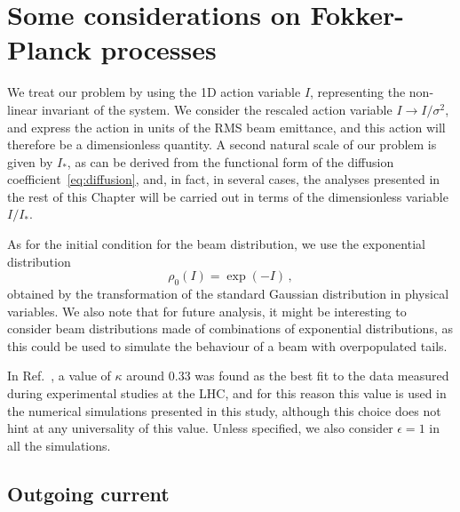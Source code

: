 \section{Some considerations on Fokker-Planck processes}\label{sec:some_considerations}

We treat our problem by using the 1D action variable $I$, representing the non-linear invariant of the system. We consider the rescaled action variable $I \to I/\sigma^2$, and express the action in units of {the RMS} beam emittance, and this action will therefore be a dimensionless quantity. {A second natural scale of our problem is given by $I_\ast$, as can be derived from the functional form of the diffusion coefficient~\eqref{eq:diffusion}, and, in fact, in several cases, the analyses presented in the rest of this Chapter will be carried out in terms of the dimensionless variable $I/I_\ast$.}

As for the initial condition for the beam distribution, we use the exponential distribution
\begin{equation}
    \rho_0(I) = \exp(-I) \, , 
    \label{eq:initial_distribution}
\end{equation}
obtained by the transformation of the standard Gaussian distribution in physical variables. We also note that for future analysis, it might be interesting to consider beam distributions made of combinations of exponential distributions, as this could be used to simulate the behaviour of a beam with overpopulated tails.

In Ref.~\cite{bazzani2020diffusion}, a value of $\kappa$ around $0.33$ was found as the best fit to the data measured during experimental studies at the LHC, and for this reason this value is used in the numerical simulations presented in this study, {although this choice does not hint at any universality of this value.} Unless specified, we also consider $\epsilon=1$ in all the simulations.

\subsection{Outgoing current}\label{subsec:outgoing_current}


